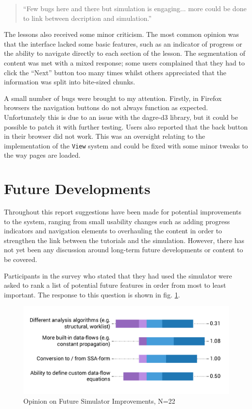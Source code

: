 \documentclass[bsc,twoside,singlespacing,parskip,logo,notimes,normalheadings]{infthesis}
\begin{document}
    \begin{quote}
      ``Few bugs here and there but simulation is engaging... more could
      be done to link between decription and simulation.''
    \end{quote}

    The lessons also received some minor criticism. The most common
    opinion was that the interface lacked some basic features, such as
    an indicator of progress or the ability to navigate directly to
    each section of the lesson. The segmentation of content was met
    with a mixed response; some users complained that they had to
    click the ``Next'' button too many times whilst others appreciated
    that the information was split into bite-sized chunks.

    A small number of bugs were brought to my attention. Firstly, in
    Firefox browsers the navigation buttons do not always function as
    expected. Unfortunately this is due to an issue with the dagre-d3
    library, but it could be possible to patch it with further
    testing. Users also reported that the back button in their browser
    did not work. This was an oversight relating to the implementation
    of the {\tt View} system and could be fixed with some minor tweaks
    to the way pages are loaded.

    \section{Future Developments}
    
    Throughout this report suggestions have been made for potential
    improvements to the system, ranging from small usability changes
    such as adding progress indicators and navigation elements to
    overhauling the content in order to strengthen the link between
    the tutorials and the simulation. However, there has not yet been
    any discussion around long-term future developments or content to
    be covered.

    Participants in the survey who stated that they had used the
    simulator were asked to rank a list of potential future features
    in order from most to least important. The response to this
    question is shown in fig. \ref{fig:future-features}.

    \begin{figure}[!htb]
      \centering
      \captionsetup{width=\textwidth, justification=centering}
      \caption{Opinion on Future Simulator Improvements, N=22}\label{fig:future-features}
      \includegraphics[width=\textwidth, trim=0 20 0 20, clip]{img/simulator_improvements.pdf}
    \end{figure}
\end{document}
